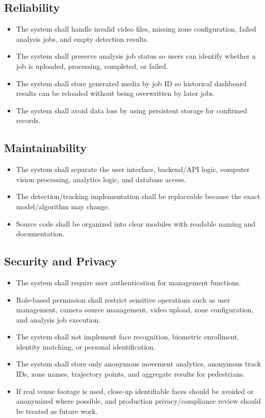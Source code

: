\documentclass[12pt,a4paper]{report}
\begin{document}
\subsection*{Reliability}
\begin{itemize}
    \item The system shall handle invalid video files, missing zone configuration, failed analysis jobs, and empty detection results.
    \item The system shall preserve analysis job status so users can identify whether a job is uploaded, processing, completed, or failed.
    \item The system shall store generated media by job ID so historical dashboard results can be reloaded without being overwritten by later jobs.
    \item The system shall avoid data loss by using persistent storage for confirmed records.
\end{itemize}

\subsection*{Maintainability}
\begin{itemize}
    \item The system shall separate the user interface, backend/API logic, computer vision processing, analytics logic, and database access.
    \item The detection/tracking implementation shall be replaceable because the exact model/algorithm may change.
    \item Source code shall be organized into clear modules with readable naming and documentation.
\end{itemize}

\subsection*{Security and Privacy}
\begin{itemize}
    \item The system shall require user authentication for management functions.
    \item Role-based permission shall restrict sensitive operations such as user management, camera source management, video upload, zone configuration, and analysis job execution.
    \item The system shall not implement face recognition, biometric enrollment, identity matching, or personal identification.
    \item The system shall store only anonymous movement analytics, anonymous track IDs, zone names, trajectory points, and aggregate results for pedestrians.
    \item If real venue footage is used, close-up identifiable faces should be avoided or anonymized where possible, and production privacy/compliance review should be treated as future work.
\end{itemize}
\end{document}
